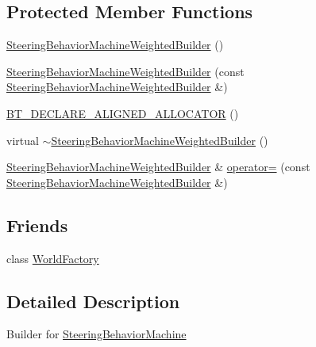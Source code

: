\subsection*{Protected Member Functions}
\begin{DoxyCompactItemize}
\item 
\mbox{\hyperlink{classnjli_1_1_steering_behavior_machine_weighted_builder_aa347e80a7d046c3862a41cb8dd9ac97a}{Steering\+Behavior\+Machine\+Weighted\+Builder}} ()
\item 
\mbox{\hyperlink{classnjli_1_1_steering_behavior_machine_weighted_builder_a52d99f004ac2cf6cd965048da4a1fdb6}{Steering\+Behavior\+Machine\+Weighted\+Builder}} (const \mbox{\hyperlink{classnjli_1_1_steering_behavior_machine_weighted_builder}{Steering\+Behavior\+Machine\+Weighted\+Builder}} \&)
\item 
\mbox{\hyperlink{classnjli_1_1_steering_behavior_machine_weighted_builder_a032bf841e9af32853511fb365dc0d2e8}{B\+T\+\_\+\+D\+E\+C\+L\+A\+R\+E\+\_\+\+A\+L\+I\+G\+N\+E\+D\+\_\+\+A\+L\+L\+O\+C\+A\+T\+OR}} ()
\item 
virtual \mbox{\hyperlink{classnjli_1_1_steering_behavior_machine_weighted_builder_a4bf3deea6e63ce32e6faac04cafa21c3}{$\sim$\+Steering\+Behavior\+Machine\+Weighted\+Builder}} ()
\item 
\mbox{\hyperlink{classnjli_1_1_steering_behavior_machine_weighted_builder}{Steering\+Behavior\+Machine\+Weighted\+Builder}} \& \mbox{\hyperlink{classnjli_1_1_steering_behavior_machine_weighted_builder_a85ba138993f1c1e1c4acd808e21e0716}{operator=}} (const \mbox{\hyperlink{classnjli_1_1_steering_behavior_machine_weighted_builder}{Steering\+Behavior\+Machine\+Weighted\+Builder}} \&)
\end{DoxyCompactItemize}
\subsection*{Friends}
\begin{DoxyCompactItemize}
\item 
class \mbox{\hyperlink{classnjli_1_1_steering_behavior_machine_weighted_builder_acb96ebb09abe8f2a37a915a842babfac}{World\+Factory}}
\end{DoxyCompactItemize}


\subsection{Detailed Description}
Builder for \mbox{\hyperlink{classnjli_1_1_steering_behavior_machine}{Steering\+Behavior\+Machine}} 

